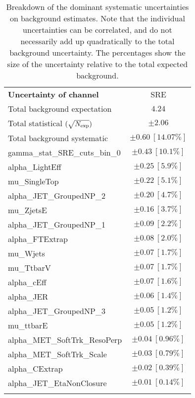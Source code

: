 
\begin{table}
\begin{center}
\setlength{\tabcolsep}{0.0pc}
\begin{tabular*}{\textwidth}{@{\extracolsep{\fill}}lc}
\noalign{\smallskip}\hline\noalign{\smallskip}
{\bf Uncertainty of channel}                                    & SRE            \\
\noalign{\smallskip}\hline\noalign{\smallskip}
Total background expectation             &  $4.24$       \\
\noalign{\smallskip}\hline\noalign{\smallskip}
Total statistical $(\sqrt{N_{\rm exp}})$              & $\pm 2.06$       \\
Total background systematic               & $\pm 0.60\ [14.07\%] $             \\
\noalign{\smallskip}\hline\noalign{\smallskip}
\noalign{\smallskip}\hline\noalign{\smallskip}
gamma\_stat\_SRE\_cuts\_bin\_0         & $\pm 0.43\ [10.1\%] $       \\
alpha\_LightEff         & $\pm 0.25\ [5.9\%] $       \\
mu\_SingleTop         & $\pm 0.22\ [5.1\%] $       \\
alpha\_JET\_GroupedNP\_2         & $\pm 0.20\ [4.7\%] $       \\
mu\_ZjetsE         & $\pm 0.16\ [3.7\%] $       \\
alpha\_JET\_GroupedNP\_1         & $\pm 0.09\ [2.2\%] $       \\
alpha\_FTExtrap         & $\pm 0.08\ [2.0\%] $       \\
mu\_Wjets         & $\pm 0.07\ [1.7\%] $       \\
mu\_TtbarV         & $\pm 0.07\ [1.7\%] $       \\
alpha\_cEff         & $\pm 0.07\ [1.6\%] $       \\
alpha\_JER         & $\pm 0.06\ [1.4\%] $       \\
alpha\_JET\_GroupedNP\_3         & $\pm 0.05\ [1.2\%] $       \\
mu\_ttbarE         & $\pm 0.05\ [1.2\%] $       \\
alpha\_MET\_SoftTrk\_ResoPerp         & $\pm 0.04\ [0.96\%] $       \\
alpha\_MET\_SoftTrk\_Scale         & $\pm 0.03\ [0.79\%] $       \\
alpha\_CExtrap         & $\pm 0.02\ [0.39\%] $       \\
alpha\_JET\_EtaNonClosure         & $\pm 0.01\ [0.14\%] $       \\
\noalign{\smallskip}\hline\noalign{\smallskip}
\end{tabular*}
\end{center}
\caption[Breakdown of uncertainty on background estimates]{
Breakdown of the dominant systematic uncertainties on background estimates.
Note that the individual uncertainties can be correlated, and do not necessarily add up quadratically to 
the total background uncertainty. The percentages show the size of the uncertainty relative to the total expected background.
\label{table.results.bkgestimate.uncertainties.SRE}}
\end{table}
%